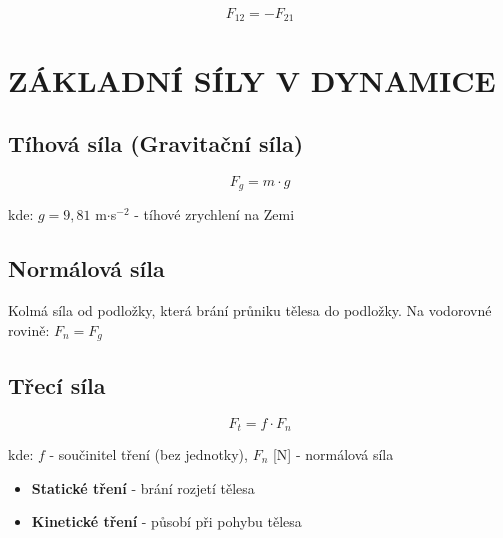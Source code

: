 \documentclass[a4paper,11pt]{article}
\begin{document}
\begin{equationbox}
\begin{equation*}
    F_{12} = -F_{21}
\end{equation*}
\end{equationbox}

\section{ZÁKLADNÍ SÍLY V DYNAMICE}

\subsection{Tíhová síla (Gravitační síla)}

\begin{equationbox}
\begin{equation*}
    F_g = m \cdot g
\end{equation*}
\end{equationbox}

\begin{notebox}
kde: $g = 9{,}81$ m$\cdot$s$^{-2}$ - tíhové zrychlení na Zemi
\end{notebox}

\subsection{Normálová síla}

\begin{definitionbox}
Kolmá síla od podložky, která brání průniku tělesa do podložky. Na vodorovné rovině: $F_n = F_g$
\end{definitionbox}

\subsection{Třecí síla}

\begin{equationbox}
\begin{equation*}
    F_t = f \cdot F_n
\end{equation*}
\end{equationbox}

\begin{notebox}
kde: $f$ - součinitel tření (bez jednotky), $F_n$ [N] - normálová síla
\end{notebox}

\begin{itemize}
    \item \textbf{Statické tření} - brání rozjetí tělesa
    \item \textbf{Kinetické tření} - působí při pohybu tělesa
\end{itemize}
\end{document}
